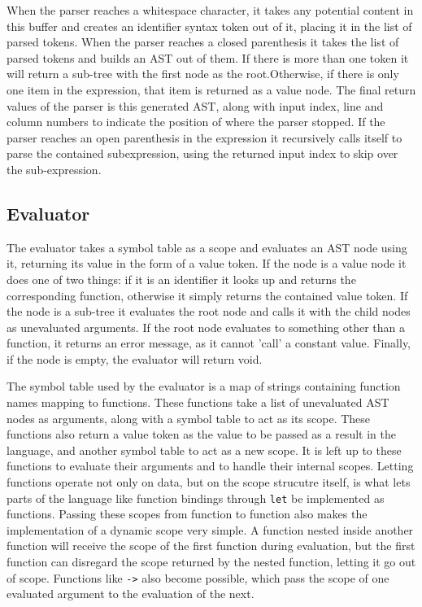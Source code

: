 \documentclass[11pt]{article}
\begin{document}
    When the parser reaches a whitespace character, it takes
    any potential content in this buffer and creates an identifier syntax token out of it, placing it in the list of parsed tokens.
    When the parser reaches a closed parenthesis it takes the list of parsed tokens and builds an AST out of them. If there is more than
    one token it will return a sub-tree with the first node as the root.\newline Otherwise, if there is only one item in the expression, that item is
    returned as a value node. The final return values of the parser is this generated AST, along with input index, line and column numbers to
    indicate the position of where the parser stopped. If the parser reaches an open parenthesis in the expression it recursively calls itself to
    parse the contained subexpression, using the returned input index to skip over the sub-expression.

\subsection{Evaluator}

    The evaluator takes a symbol table as a scope and evaluates an AST node using it, returning its value in the form of a value token.
    If the node is a value node it does one of two things: if it is an identifier it looks up and returns the corresponding function,
    otherwise it simply returns the contained value token. If the node is a sub-tree it evaluates the root node and calls it with the child
    nodes as unevaluated arguments. If the root node evaluates to something other than a function, it returns an error message, as it cannot
    'call' a constant value. Finally, if the node is empty, the evaluator will return void.
    
    The symbol table used by the evaluator is a map of strings containing function names mapping to functions. These functions take a list of unevaluated
    AST nodes as arguments, along with a symbol table to act as its scope. These functions also return a value token as the value to be passed
    as a result in the language, and another symbol table to act as a new scope. It is left up to these functions to evaluate their arguments and
    to handle their internal scopes. Letting functions operate not only on data, but on the scope strucutre itself, is what lets parts of the
    language like function bindings through \lstinline{let} be implemented as functions. Passing these scopes from function to function also makes the
    implementation of a dynamic scope very simple. A function nested inside another function will receive the scope of the first function during
    evaluation, but the first function can disregard the scope returned by the nested function, letting it go out of scope. Functions like \lstinline{->}
    also become possible, which pass the scope of one evaluated argument to the evaluation of the next.
\end{document}
